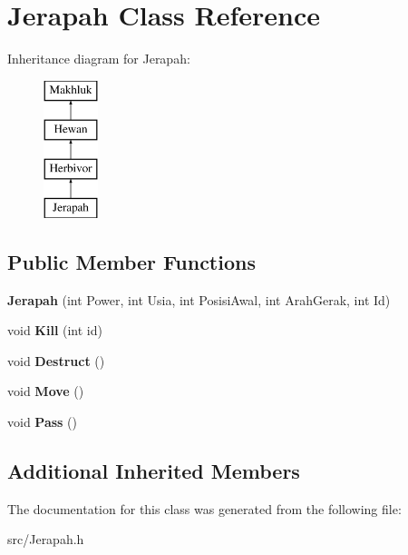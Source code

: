 \hypertarget{class_jerapah}{}\section{Jerapah Class Reference}
\label{class_jerapah}
Inheritance diagram for Jerapah\+:\begin{figure}[H]
\begin{center}
\leavevmode
\includegraphics[height=4.000000cm]{class_jerapah}
\end{center}
\end{figure}
\subsection*{Public Member Functions}
\begin{DoxyCompactItemize}
\item 
\hypertarget{class_jerapah_ae137c991cfbc6ff9ebcaa074e5968993}{}{\bfseries Jerapah} (int Power, int Usia, int Posisi\+Awal, int Arah\+Gerak, int Id)\label{class_jerapah_ae137c991cfbc6ff9ebcaa074e5968993}

\item 
\hypertarget{class_jerapah_acb4714a510027900c4a3cb49acbdff5d}{}void {\bfseries Kill} (int id)\label{class_jerapah_acb4714a510027900c4a3cb49acbdff5d}

\item 
\hypertarget{class_jerapah_abb8dd76c0480d03bb6cb8784dce6f6f0}{}void {\bfseries Destruct} ()\label{class_jerapah_abb8dd76c0480d03bb6cb8784dce6f6f0}

\item 
\hypertarget{class_jerapah_a5a1dcc4324ff51a96d1e853d437a3017}{}void {\bfseries Move} ()\label{class_jerapah_a5a1dcc4324ff51a96d1e853d437a3017}

\item 
\hypertarget{class_jerapah_ad8ac2941f6d41b41515ec1ef31cd8556}{}void {\bfseries Pass} ()\label{class_jerapah_ad8ac2941f6d41b41515ec1ef31cd8556}

\end{DoxyCompactItemize}
\subsection*{Additional Inherited Members}


The documentation for this class was generated from the following file\+:\begin{DoxyCompactItemize}
\item 
src/Jerapah.\+h\end{DoxyCompactItemize}
